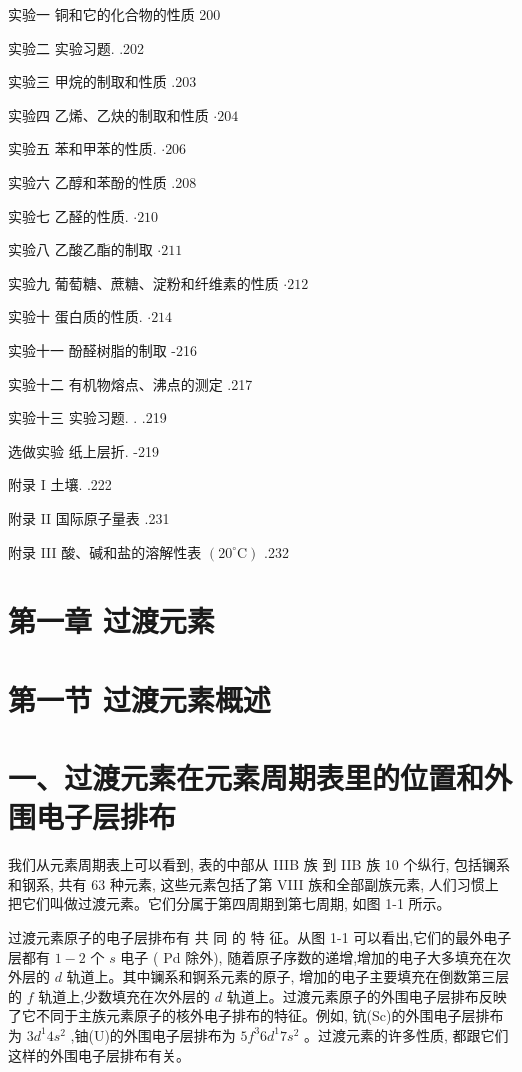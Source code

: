 \documentclass[10pt]{article}
\begin{document}
实验一 铜和它的化合物的性质 200

实验二 实验习题. .202

实验三 甲烷的制取和性质 .203

实验四 乙烯、乙炔的制取和性质 \(\cdot {204}\)

实验五 苯和甲苯的性质. \(\cdot {206}\)

实验六 乙醇和苯酚的性质 .208

实验七 乙醛的性质. \(\cdot {210}\)

实验八 乙酸乙酯的制取 \(\cdot {211}\)

实验九 葡萄糖、蔗糖、淀粉和纤维素的性质 \(\cdot {212}\)

实验十 蛋白质的性质. \(\cdot {214}\)

实验十一 酚醛树脂的制取 -216

实验十二 有机物熔点、沸点的测定 .217

实验十三 实验习题. . .219

选做实验 纸上层折. -219

附录 \(\mathrm{I}\) 土壤. .222

附录 II 国际原子量表 .231

附录 III 酸、碱和盐的溶解性表 \(\left( {{20}^{ \circ }\mathrm{C}}\right)\) .232

\section*{第一章 过渡元素}

\section*{第一节 过渡元素概述}

\section*{一、过渡元素在元素周期表里的位置和外围电子层排布}

我们从元素周期表上可以看到, 表的中部从 IIIB 族 到 IIB 族 10 个纵行, 包括镧系和钢系, 共有 63 种元素, 这些元素包括了第 VIII 族和全部副族元素, 人们习惯上把它们叫做过渡元素。它们分属于第四周期到第七周期, 如图 1-1 所示。

过渡元素原子的电子层排布有 共 同 的 特 征。从图 1-1 可以看出,它们的最外电子层都有 \(1 - 2\) 个 \(s\) 电子 ( \(\mathrm{{Pd}}\) 除外), 随着原子序数的递增,增加的电子大多填充在次外层的 \(d\) 轨道上。其中镧系和锕系元素的原子, 增加的电子主要填充在倒数第三层的 \(f\) 轨道上,少数填充在次外层的 \(d\) 轨道上。过渡元素原子的外围电子层排布反映了它不同于主族元素原子的核外电子排布的特征。例如, 钪(Sc)的外围电子层排布为 \(3{d}^{1}4{s}^{2}\) ,铀(U)的外围电子层排布为 \(5{f}^{3}6{d}^{1}7{s}^{2}\) 。过渡元素的许多性质, 都跟它们这样的外围电子层排布有关。
\end{document}
